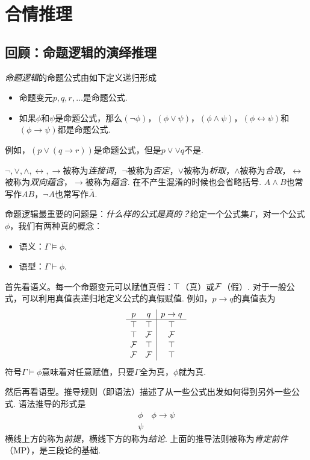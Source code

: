 \chapter{合情推理}\label{chap:plausible-reasoning}


\section{回顾：命题逻辑的演绎推理}

\emph{命题逻辑}的命题公式由如下定义递归形成
\begin{itemize}
    \item 命题变元$p,q,r,\dots$是命题公式.
    \item 如果$\phi$和$\psi$是命题公式，那么$(\neg\phi)$，$(\phi\vee\psi)$，$(\phi\wedge\psi)$，$(\phi\leftrightarrow\psi)$和$(\phi\to\psi)$都是命题公式.
\end{itemize}
例如，$(p\vee(q\to r))$是命题公式，但是$p\vee\vee q$不是. 

$\neg,\vee,\wedge,\leftrightarrow,\to$被称为\emph{连接词}，$\neg$被称为\emph{否定}，$\vee$被称为\emph{析取}，$\wedge$被称为\emph{合取}，$\leftrightarrow$被称为\emph{双向蕴含}，$\to$被称为\emph{蕴含}. 在不产生混淆的时候也会省略括号. $A\wedge B$也常写作$AB$，$\neg A$也常写作$\overline{A}$.

命题逻辑最重要的问题是：\emph{什么样的公式是真的？}给定一个公式集$\Gamma$，对一个公式$\phi$，我们有两种真的概念：
    \begin{itemize}
        \item 语义：$\Gamma\models \phi$.
        \item 语型：$\Gamma\vdash \phi$.
    \end{itemize}

首先看语义。每一个命题变元可以赋值真假：$\top$（真）或$\mathcal{F}$（假）. 对于一般公式，可以利用真值表递归地定义公式的真假赋值. 例如，$p\to q$的真值表为
        \[\begin{array}{cc|c}
        p&q&p\to q\\\hline
             \top&\top&\top  \\
             \top&\mathcal{F}&\mathcal{F}  \\
             \mathcal{F}&\top&\top  \\
             \mathcal{F}&\mathcal{F}&\top  \\
        \end{array}\]
符号$\Gamma\models\phi$意味着对任意赋值，只要$\Gamma$全为真，$\phi$就为真.


然后再看语型。推导规则（即语法）描述了从一些公式出发如何得到另外一些公式. 语法推导的形式是
    \[\begin{array}{c}
         \phi\quad\phi\to\psi  \\\hline
         \psi
    \end{array}\]
横线上方的称为\emph{前提}，横线下方的称为\emph{结论}. 上面的推导法则被称为\emph{肯定前件}（MP），是三段论的基础.


